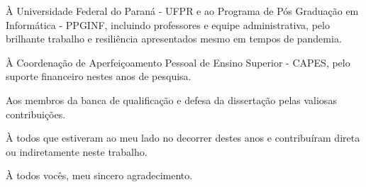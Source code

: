 \begin{agradece}
À Universidade Federal do Paraná - UFPR e ao Programa de Pós Graduação em Informática - PPGINF, incluindo professores e equipe administrativa, pelo brilhante trabalho e resiliência apresentados mesmo em tempos de pandemia.

À Coordenação de Aperfeiçoamento Pessoal de Ensino Superior - CAPES, pelo suporte financeiro nestes anos de pesquisa.

Aos membros da banca de qualificação e defesa da dissertação pelas valiosas contribuições.

À todos que estiveram ao meu lado no decorrer destes anos e contribuíram direta ou indiretamente neste trabalho. 

À todos vocês, meu sincero agradecimento.

\end{agradece}

